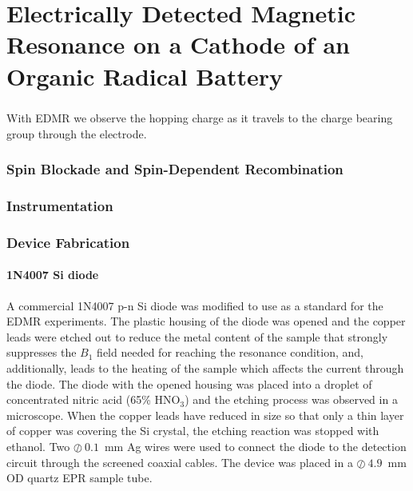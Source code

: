 \chapter{Electrically Detected Magnetic Resonance on a Cathode of an Organic Radical Battery}

\paragraph*{}
With EDMR we observe the hopping charge as it travels to the charge bearing group through the electrode.

\subsection{Spin Blockade and Spin-Dependent Recombination}

\subsection{Instrumentation}

\subsection{Device Fabrication}
\subsubsection{1N4007 Si diode}
A commercial 1N4007 p-n Si diode was modified to use as a standard for the EDMR experiments. The plastic housing of the diode was opened and the copper leads were etched out to reduce the metal content of the sample that strongly suppresses the $B_1$ field needed for reaching the resonance condition, and, additionally, leads to the heating of the sample which affects the current through the diode. The diode with the opened housing was placed into a droplet of concentrated nitric acid (65\% HNO$_3$) and the etching process was observed in a microscope. When the copper leads have reduced in size so that only a thin layer of copper was covering the Si crystal, the etching reaction was stopped with ethanol. Two $\oslash~0.1$~mm Ag wires were used to connect the diode to the detection circuit through the screened coaxial cables. The device was placed in a $\oslash~4.9$~mm OD quartz EPR sample tube.\\

